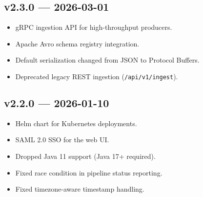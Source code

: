\documentclass[
    language=english,
    doctype=article,
    institution=none,
]{../../omnilatex}
\begin{document}
\subsection*{v2.3.0 --- 2026-03-01}
\begin{itemize}
    \item gRPC ingestion API for high-throughput producers.
    \item Apache Avro schema registry integration.
    \item Default serialization changed from JSON to Protocol Buffers.
    \item Deprecated legacy REST ingestion (\texttt{/api/v1/ingest}).
\end{itemize}

\subsection*{v2.2.0 --- 2026-01-10}
\begin{itemize}
    \item Helm chart for Kubernetes deployments.
    \item SAML 2.0 SSO for the web UI.
    \item Dropped Java 11 support (Java 17+ required).
    \item Fixed race condition in pipeline status reporting.
    \item Fixed timezone-aware timestamp handling.
\end{itemize}

\printbibliography[heading=none]
\end{document}

